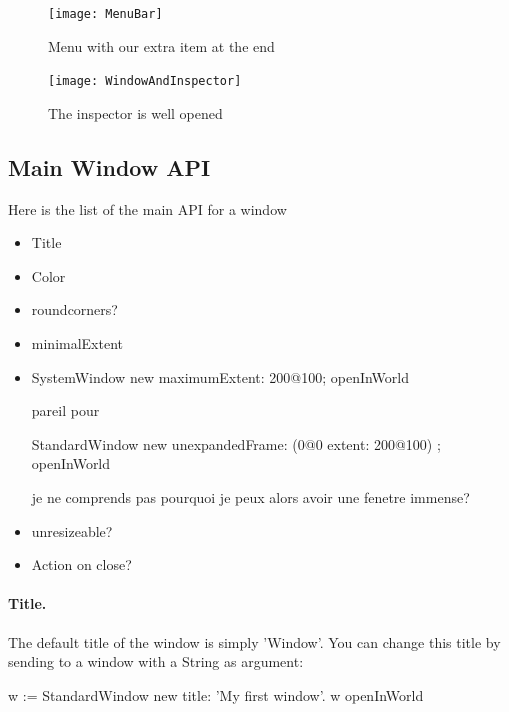 \documentclass[a4paper,10pt,twoside]{book}
\begin{document}
\begin{figure}[ht]
\begin{center}
	\texttt{[image: MenuBar]}
	\caption{Menu with our extra item at the end}
\end{center}
\end{figure}

\begin{figure}[ht]
\begin{center}
	\texttt{[image: WindowAndInspector]}
	\caption{The inspector is well opened}
\end{center}
\end{figure}

\subsection{Main Window API}

 Here is the list of the main API for a window

\begin{itemize}
\item Title
\item Color
\item roundcorners?
\item minimalExtent
\item 

\begin{code}{}
SystemWindow new
	maximumExtent: 200@100; openInWorld

pareil pour 

StandardWindow new
	unexpandedFrame: (0@0 extent: 200@100) ; openInWorld
\end{code}

je ne comprends pas pourquoi je peux alors avoir une fenetre immense? 

\item unresizeable? 
\item Action on close? 
\end{itemize}

\paragraph*{Title.}
The default title of the window is simply 'Window'. You can change this title by sending  to a window with a String as argument:
\begin{code}{}
w := StandardWindow new title: 'My first window'.
w openInWorld
\end{code}
\end{document}
